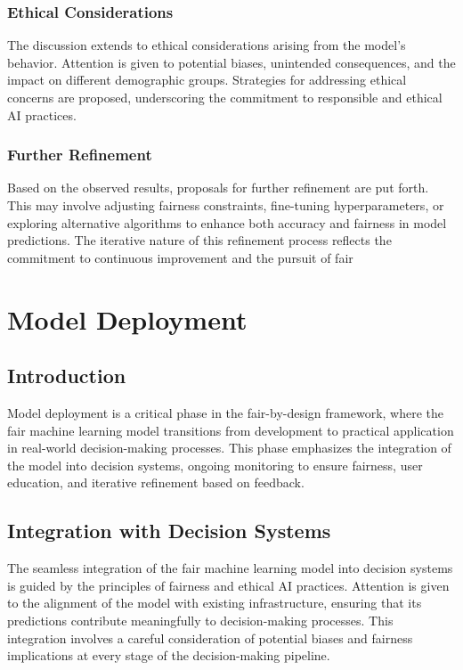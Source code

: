 \documentclass[12pt,a4paper,openright,twoside]{book}
\begin{document}
\subsubsection{Ethical Considerations}

The discussion extends to ethical considerations arising from the model's behavior. Attention is given to potential biases, unintended consequences, and the impact on different demographic groups. Strategies for addressing ethical concerns are proposed, underscoring the commitment to responsible and ethical AI practices.

\subsubsection{Further Refinement}

Based on the observed results, proposals for further refinement are put forth. This may involve adjusting fairness constraints, fine-tuning hyperparameters, or exploring alternative algorithms to enhance both accuracy and fairness in model predictions. The iterative nature of this refinement process reflects the commitment to continuous improvement and the pursuit of fair

\section{Model Deployment}

\subsection{Introduction}

Model deployment is a critical phase in the fair-by-design framework, where the fair machine learning model transitions from development to practical application in real-world decision-making processes. This phase emphasizes the integration of the model into decision systems, ongoing monitoring to ensure fairness, user education, and iterative refinement based on feedback.

\subsection{Integration with Decision Systems}

The seamless integration of the fair machine learning model into decision systems is guided by the principles of fairness and ethical AI practices. Attention is given to the alignment of the model with existing infrastructure, ensuring that its predictions contribute meaningfully to decision-making processes. This integration involves a careful consideration of potential biases and fairness implications at every stage of the decision-making pipeline.
\end{document}
